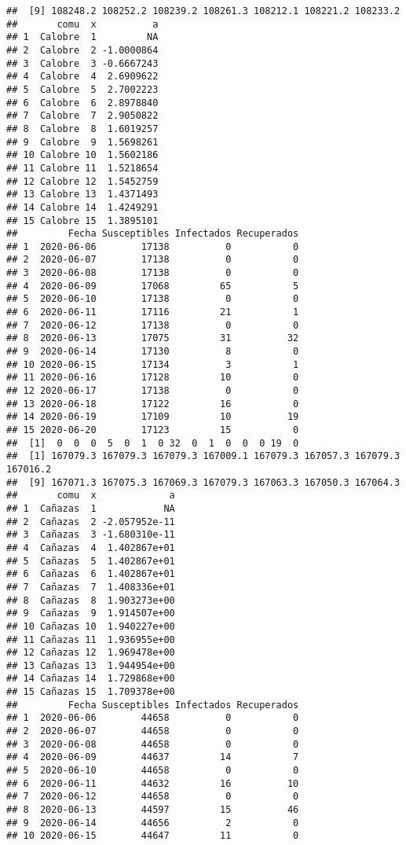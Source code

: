 \documentclass[
]{article}
\begin{document}
\begin{verbatim}
##  [9] 108248.2 108252.2 108239.2 108261.3 108212.1 108221.2 108233.2
##       comu  x          a
## 1  Calobre  1         NA
## 2  Calobre  2 -1.0000864
## 3  Calobre  3 -0.6667243
## 4  Calobre  4  2.6909622
## 5  Calobre  5  2.7002223
## 6  Calobre  6  2.8978840
## 7  Calobre  7  2.9050822
## 8  Calobre  8  1.6019257
## 9  Calobre  9  1.5698261
## 10 Calobre 10  1.5602186
## 11 Calobre 11  1.5218654
## 12 Calobre 12  1.5452759
## 13 Calobre 13  1.4371493
## 14 Calobre 14  1.4249291
## 15 Calobre 15  1.3895101
##         Fecha Susceptibles Infectados Recuperados
## 1  2020-06-06        17138          0           0
## 2  2020-06-07        17138          0           0
## 3  2020-06-08        17138          0           0
## 4  2020-06-09        17068         65           5
## 5  2020-06-10        17138          0           0
## 6  2020-06-11        17116         21           1
## 7  2020-06-12        17138          0           0
## 8  2020-06-13        17075         31          32
## 9  2020-06-14        17130          8           0
## 10 2020-06-15        17134          3           1
## 11 2020-06-16        17128         10           0
## 12 2020-06-17        17138          0           0
## 13 2020-06-18        17122         16           0
## 14 2020-06-19        17109         10          19
## 15 2020-06-20        17123         15           0
##  [1]  0  0  0  5  0  1  0 32  0  1  0  0  0 19  0
##  [1] 167079.3 167079.3 167079.3 167009.1 167079.3 167057.3 167079.3 167016.2
##  [9] 167071.3 167075.3 167069.3 167079.3 167063.3 167050.3 167064.3
##       comu  x             a
## 1  Cañazas  1            NA
## 2  Cañazas  2 -2.057952e-11
## 3  Cañazas  3 -1.680310e-11
## 4  Cañazas  4  1.402867e+01
## 5  Cañazas  5  1.402867e+01
## 6  Cañazas  6  1.402867e+01
## 7  Cañazas  7  1.408336e+01
## 8  Cañazas  8  1.903273e+00
## 9  Cañazas  9  1.914507e+00
## 10 Cañazas 10  1.940227e+00
## 11 Cañazas 11  1.936955e+00
## 12 Cañazas 12  1.969478e+00
## 13 Cañazas 13  1.944954e+00
## 14 Cañazas 14  1.729868e+00
## 15 Cañazas 15  1.709378e+00
##         Fecha Susceptibles Infectados Recuperados
## 1  2020-06-06        44658          0           0
## 2  2020-06-07        44658          0           0
## 3  2020-06-08        44658          0           0
## 4  2020-06-09        44637         14           7
## 5  2020-06-10        44658          0           0
## 6  2020-06-11        44632         16          10
## 7  2020-06-12        44658          0           0
## 8  2020-06-13        44597         15          46
## 9  2020-06-14        44656          2           0
## 10 2020-06-15        44647         11           0

\end{verbatim}
\end{document}
